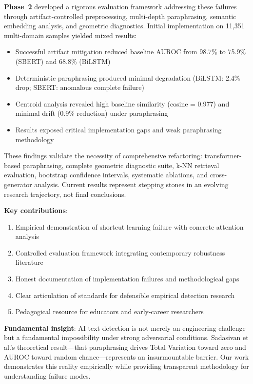 \documentclass[conference]{IEEEtran}
\begin{document}
\textbf{Phase~2} developed a rigorous evaluation framework addressing these failures through artifact-controlled preprocessing, multi-depth paraphrasing, semantic embedding analysis, and geometric diagnostics. Initial implementation on 11,351 multi-domain samples yielded mixed results:

\begin{itemize}
    \item Successful artifact mitigation reduced baseline AUROC from 98.7\% to 75.9\% (SBERT) and 68.8\% (BiLSTM)
    \item Deterministic paraphrasing produced minimal degradation (BiLSTM: 2.4\% drop; SBERT: anomalous complete failure)
    \item Centroid analysis revealed high baseline similarity (cosine = 0.977) and minimal drift (0.9\% reduction) under paraphrasing
    \item Results exposed critical implementation gaps and weak paraphrasing methodology
\end{itemize}

These findings validate the necessity of comprehensive refactoring: transformer-based paraphrasing, complete geometric diagnostic suite, k-NN retrieval evaluation, bootstrap confidence intervals, systematic ablations, and cross-generator analysis. Current results represent stepping stones in an evolving research trajectory, not final conclusions.

\textbf{Key contributions}:
\begin{enumerate}
    \item Empirical demonstration of shortcut learning failure with concrete attention analysis
    \item Controlled evaluation framework integrating contemporary robustness literature
    \item Honest documentation of implementation failures and methodological gaps
    \item Clear articulation of standards for defensible empirical detection research
    \item Pedagogical resource for educators and early-career researchers
\end{enumerate}

\textbf{Fundamental insight}: AI text detection is not merely an engineering challenge but a fundamental impossibility under strong adversarial conditions. Sadasivan et al.'s theoretical result—that paraphrasing drives Total Variation toward zero and AUROC toward random chance—represents an insurmountable barrier. Our work demonstrates this reality empirically while providing transparent methodology for understanding failure modes.
\end{document}

